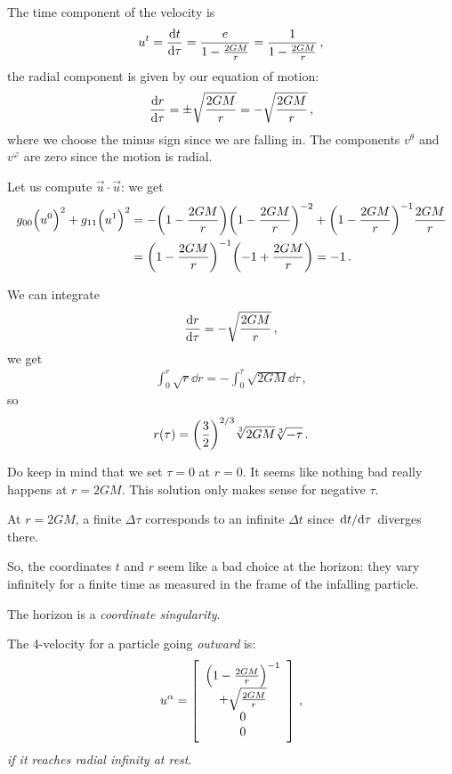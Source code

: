 \documentclass[main.tex]{subfiles}
\begin{document}
The time component of the velocity is 
%
\begin{align}
  u^{t} = \dv{t}{\tau } = \frac{e}{1 - \frac{2GM}{r}} = \frac{1}{1 - \frac{2GM}{r}} 
\,,
\end{align}
%
the radial component is given by our equation of motion: 
%
\begin{align}
  \dv{r}{\tau } = \pm \sqrt{\frac{2GM}{r}} = - \sqrt{\frac{2GM}{r}} 
\,,
\end{align}
%
where we choose the minus sign since we are falling in. The components \(v^{\theta }\) and \(v^{\varphi }\) are zero since the motion is radial.  

Let us compute \(\vec{u} \cdot \vec{u}\): we get 
%
\begin{align}
  g_{00} \qty(u^{0})^2 + g_{11} \qty(u^{1})^2
  &= - \qty(1 - \frac{2GM}{r})\qty(1 - \frac{2GM}{r})^{-2}
  + \qty(1 - \frac{2GM}{r})^{-1} \frac{2GM}{r}  \\
  &= \qty(1 - \frac{2GM}{r})^{-1} \qty(-1 + \frac{2GM}{r})= -1 
\,.
\end{align}
%

We can integrate 
%
\begin{align}
  \dv{r}{\tau } = - \sqrt{\frac{2GM}{r}}
\,,
\end{align}
%
we get 
%
\begin{align}
  \int _{0}^{r} \sqrt{r} \dd{r} =- \int _{0}^{\tau } \sqrt{2GM} \dd{\tau }   
\,,
\end{align}
%
so 
%
\begin{align}
  r(\tau ) = \qty(\frac{3}{2})^{2/3} \sqrt[3]{2GM} \sqrt[3]{- \tau } 
\,.
\end{align}

Do keep in mind that we set \(\tau =0\) at \(r=0\). 
It seems like nothing bad really happens at \(r=2GM\). 
This solution only makes sense for negative \(\tau \). 

At \(r = 2GM\), a finite \(\Delta \tau \) corresponds to an infinite \(\Delta t\) since \(\dv*{t}{\tau }\) diverges  there. 

So, the coordinates \(t\) and \(r\) seem like a bad choice at the horizon: they vary infinitely for a finite time as measured in the frame of the infalling particle. 

The horizon is a \emph{coordinate singularity}. 

The 4-velocity for a particle going \emph{outward} is: 
%
\begin{align}
  u^{\alpha } = \left[\begin{array}{c}
    \qty(1 - \frac{2GM}{r})^{-1} \\ 
  + \sqrt{\frac{2GM}{r}} \\ 
  0 \\ 
  0
  \end{array}\right]
\,,
\end{align}
%
\emph{if it reaches radial infinity at rest}. 
\end{document}
